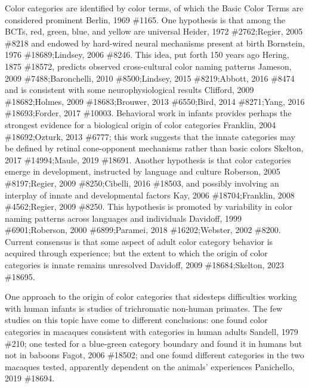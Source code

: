 Color categories are identified by color terms, of which the Basic Color Terms are considered prominent {Berlin, 1969 \#1165}. One hypothesis is that among the BCTs, red, green, blue, and yellow are universal {Heider, 1972 \#2762;Regier, 2005 \#8218} and endowed by hard-wired neural mechanisms present at birth {Bornstein, 1976 \#18689;Lindsey, 2006 \#8246}. This idea, put forth 150 years ago {Hering, 1875 \#18572}, predicts observed cross-cultural color naming patterns {Jameson, 2009 \#7488;Baronchelli, 2010 \#8500;Lindsey, 2015 \#8219;Abbott, 2016 \#8474} and is consistent with some neurophysiological results {Clifford, 2009 \#18682;Holmes, 2009 \#18683;Brouwer, 2013 \#6550;Bird, 2014 \#8271;Yang, 2016 \#18693;Forder, 2017 \#10003}. Behavioral work in infants provides perhaps the strongest evidence for a biological origin of color categories {Franklin, 2004 \#18692;Ozturk, 2013 \#6777}; this work suggests that the innate categories may be defined by retinal cone-opponent mechanisms rather than basic colors {Skelton, 2017 \#14994;Maule, 2019 \#18691}.  Another hypothesis is that color categories emerge in development, instructed by language and culture {Roberson, 2005 \#8197;Regier, 2009 \#8250;Cibelli, 2016 \#18503}, and possibly involving an interplay of innate and developmental factors {Kay, 2006 \#18704;Franklin, 2008 \#4562;Regier, 2009 \#8250}. This hypothesis is promoted by variability in color naming patterns across languages and individuals {Davidoff, 1999 \#6901;Roberson, 2000 \#6899;Paramei, 2018 \#16202;Webster, 2002 \#8200}. Current consensus is that some aspect of adult color category behavior is acquired through experience; but the extent to which the origin of color categories is innate remains unresolved {Davidoff, 2009 \#18684;Skelton, 2023 \#18695}. 

One approach to the origin of color categories that sidesteps difficulties working with human infants is studies of trichromatic non-human primates. The few studies on this topic have come to different conclusions: one found color categories in macaques consistent with categories in human adults {Sandell, 1979 \#210}; one tested for a blue-green category boundary and found it in humans but not in baboons {Fagot, 2006 \#18502}; and one found different categories in the two macaques tested, apparently dependent on the animals’ experiences {Panichello, 2019 \#18694}. 


